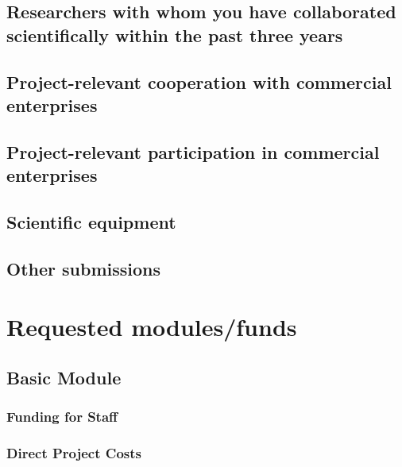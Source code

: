 \documentclass{scrartcl}
\begin{document}
\subsection{Researchers with whom you have collaborated scientifically within the past three years}

\subsection{Project-relevant cooperation with commercial enterprises}

\subsection{Project-relevant participation in commercial enterprises}

\subsection{Scientific equipment}

\subsection{Other submissions}


\section{Requested modules/funds}

\subsection{Basic Module}

\subsubsection{Funding for Staff}
\begin{funds}


\end{funds}

\subsubsection{Direct Project Costs}
\begin{funds}








\end{funds}
\end{document}
